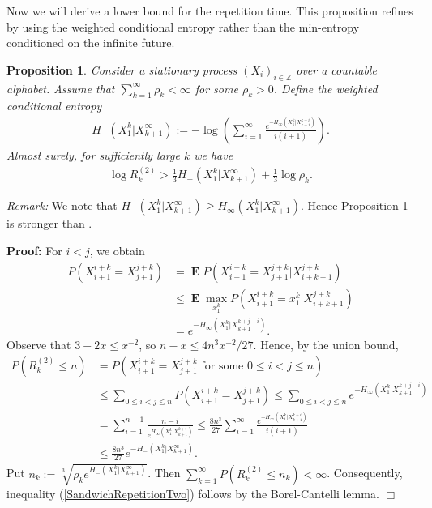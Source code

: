 \documentclass[a4paper,12pt]{article}
\newcommand{\okra}[1]{\left( #1 \right)}
\DeclareMathOperator{\mean}{\mathbf{E}}
\newtheorem{proposition}{Proposition}
\newenvironment*{proof}{\begin{trivlist}\item[]
\noindent\textbf{Proof:}}{$\Box$\par\end{trivlist}}
\begin{document}
Now we will derive a lower bound for the repetition time.  This
proposition refines \citep[Theorem 9.25]{Debowski21} by using the
weighted conditional entropy rather than the min-entropy conditioned
on the infinite future.
\begin{proposition}
  \label{theoSandwichRepetitionTwo}
  Consider a stationary process $(X_i)_{i\in\mathbb{Z}}$ over a
  countable alphabet. Assume that $\sum_{k=1}^\infty \rho_k<\infty$
  for some $\rho_k>0$. Define the weighted conditional entropy
  \begin{align}
    H_-(X_1^k|X_{k+1}^\infty):=-\log \okra{
    \sum_{i=1}^\infty\frac{e^{-H_\infty(X_1^k|X_{k+1}^{k+i})}}{i(i+1)}}.
  \end{align}
  Almost surely, for sufficiently large $k$ we have
  \begin{align}
    \label{SandwichRepetitionTwo}
    \log R^{(2)}_k> \frac{1}{3}H_-(X_1^k|X_{k+1}^\infty)
    +\frac{1}{3}\log\rho_k
    .
  \end{align}
\end{proposition}
\emph{Remark:} We note that
$H_-(X_1^k|X_{k+1}^\infty)\ge
H_\infty(X_1^k|X_{k+1}^\infty)$. Hence Proposition
\ref{theoSandwichRepetitionTwo} is stronger than \citep[Theorem
9.25]{Debowski21}.
\begin{proof}
  For $i<j$, we obtain 
\begin{align}
  P(X_{i+1}^{i+k}=X_{j+1}^{j+k})
  &=
    \mean
    P(X_{i+1}^{i+k}=X_{j+1}^{j+k}|X_{i+k+1}^{j+k})
    \nonumber\\
  &\le
    \mean \max_{x_1^k} P(X_{i+1}^{i+k}=x_1^k|X_{i+k+1}^{j+k})
    \nonumber\\
  &=
    e^{-H_\infty(X_1^k|X_{k+1}^{k+j-i})}
    .
\end{align}
Observe that $3-2x\le x^{-2}$, so $n-x\le 4n^3x^{-2}/27$.
Hence, by the union bound,
\begin{align}
  P(R^{(2)}_k\le n)
  &= P\okra{X_{i+1}^{i+k}=X_{j+1}^{j+k} \text{ for some }
    0\le i<j\le n}
    \nonumber\\
  &\le \sum_{0\le i<j\le n} P(X_{i+1}^{i+k}=X_{j+1}^{j+k})
    \le \sum_{0\le i<j\le n}  e^{-H_\infty(X_1^k|X_{k+1}^{k+j-i})}
    \nonumber\\
  &= \sum_{i=1}^{n-1}
    \frac{n-i}{e^{H_\infty(X_1^k|X_{k+1}^{k+i})}}
    \le \frac{8n^3}{27}
    \sum_{i=1}^\infty\frac{e^{-H_\infty(X_1^k|X_{k+1}^{k+i})}}{i(i+1)}
    \nonumber\\
  &\le \frac{8n^3}{27} e^{-H_-(X_1^k|X_{k+1}^\infty)}.
\end{align}
Put $n_k:=\sqrt[3]{\rho_k e^{H_-(X_1^k|X_{k+1}^\infty)}}$. Then
$\sum_{k=1}^\infty P(R^{(2)}_k\le n_k)<\infty$.  Consequently,
inequality (\ref{SandwichRepetitionTwo}) follows by the
Borel-Cantelli lemma.
\end{proof}
\end{document}
